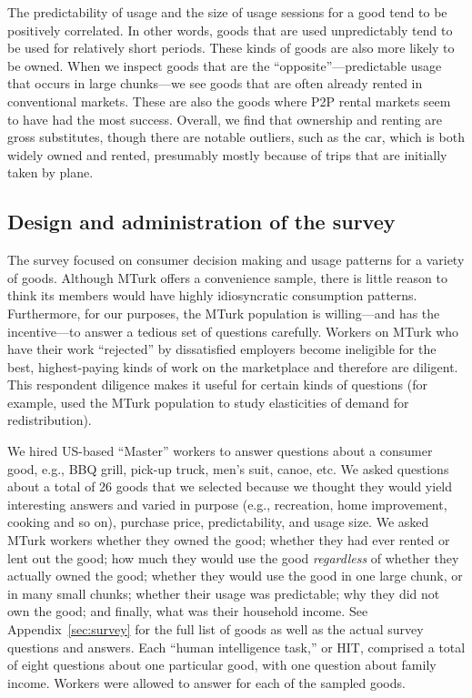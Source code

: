 \documentclass[11pt]{article}
\begin{document}
The predictability of usage and the size of usage sessions for a good tend to be positively correlated.
In other words, goods that are used unpredictably tend to be used for relatively short periods.
These kinds of goods are also more likely to be owned. 
When we inspect goods that are the ``opposite''---predictable usage that occurs in large chunks---we see goods that are often already rented in conventional markets.
These are also the goods where P2P rental markets seem to have had the most success.
Overall, we find that ownership and renting are gross substitutes, though there are notable outliers, such as the car, which is both widely owned and rented, presumably mostly because of trips that are initially taken by plane. 

\subsection{Design and administration of the survey}
The survey focused on consumer decision making and usage patterns for a variety of goods. 
Although MTurk offers a convenience sample, there is little reason to think its members would have highly idiosyncratic consumption patterns. 
Furthermore, for our purposes, the MTurk population is willing---and has the incentive---to answer a tedious set of questions carefully.
Workers on MTurk who have their work ``rejected'' by dissatisfied employers become ineligible for the best, highest-paying kinds of work on the marketplace and therefore are diligent. 
This respondent diligence makes it useful for certain kinds of questions (for example, \cite{kuziemko2013elastic} used the MTurk population to study elasticities of demand for redistribution).  

We hired US-based ``Master'' workers to answer questions about a consumer good, e.g., BBQ grill, pick-up truck, men's suit, canoe, etc.
We asked questions about a total of 26 goods that we selected because we thought they would yield interesting answers and varied in purpose (e.g., recreation, home improvement, cooking and so on), purchase price, predictability, and usage size. 
We asked MTurk workers whether they owned the good; whether they had ever rented or lent out the good; how much they would use the good \emph{regardless} of whether they actually owned the good; whether they would use the good in one large chunk, or in many small chunks; whether their usage was predictable; why they did not own the good; and finally, what was their household income. 
See Appendix~\ref{sec:survey} for the full list of goods as well as the actual survey questions and answers.  
Each ``human intelligence task,'' or HIT, comprised a total of eight questions about one particular good, with one question about family income. 
Workers were allowed to answer for each of the sampled goods.  
\end{document}
